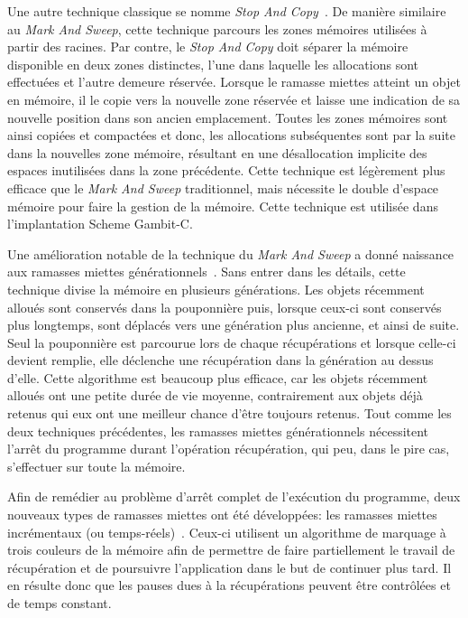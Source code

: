 \documentclass[12pt,oneside,letterpaper,francais]{book}
\begin{document}
Une autre technique classique se nomme \textit{Stop And
  Copy}~\cite{STOP_AND_COPY}. De manière similaire au \textit{Mark And
  Sweep}, cette technique parcours les zones mémoires utilisées à
partir des racines. Par contre, le \textit{Stop And Copy} doit séparer
la mémoire disponible en deux zones distinctes, l'une dans laquelle
les allocations sont effectuées et l'autre demeure réservée. Lorsque
le ramasse miettes atteint un objet en mémoire, il le copie vers la
nouvelle zone réservée et laisse une indication de sa nouvelle
position dans son ancien emplacement. Toutes les zones mémoires sont
ainsi copiées et compactées et donc, les allocations subséquentes sont
par la suite dans la nouvelles zone mémoire, résultant en une
désallocation implicite des espaces inutilisées dans la zone
précédente. Cette technique est légèrement plus efficace que le
\textit{Mark And Sweep} traditionnel, mais nécessite le double
d'espace mémoire pour faire la gestion de la mémoire. Cette technique
est utilisée dans l'implantation Scheme Gambit-C.

Une amélioration notable de la technique du \textit{Mark And Sweep} a
donné naissance aux ramasses miettes
générationnels~\cite{GEN_GC}. Sans entrer dans les détails, cette
technique divise la mémoire en plusieurs générations. Les objets
récemment alloués sont conservés dans la pouponnière puis, lorsque
ceux-ci sont conservés plus longtemps, sont déplacés vers une
génération plus ancienne, et ainsi de suite. Seul la pouponnière est
parcourue lors de chaque récupérations et lorsque celle-ci devient
remplie, elle déclenche une récupération dans la génération au dessus
d'elle. Cette algorithme est beaucoup plus efficace, car les objets
récemment alloués ont une petite durée de vie moyenne, contrairement
aux objets déjà retenus qui eux ont une meilleur chance d'être
toujours retenus. Tout comme les deux techniques précédentes, les
ramasses miettes générationnels nécessitent l'arrêt du programme
durant l'opération récupération, qui peu, dans le pire cas,
s'effectuer sur toute la mémoire.

Afin de remédier au problème d'arrêt complet de l'exécution du
programme, deux nouveaux types de ramasses miettes ont été
développées: les ramasses miettes incrémentaux (ou
temps-réels)~\cite{INCR_BAKER}. Ceux-ci utilisent un algorithme de
marquage à trois couleurs de la mémoire afin de permettre de faire
partiellement le travail de récupération et de poursuivre
l'application dans le but de continuer plus tard. Il en résulte donc
que les pauses dues à la récupérations peuvent être contrôlées et de
temps constant.
\end{document}
